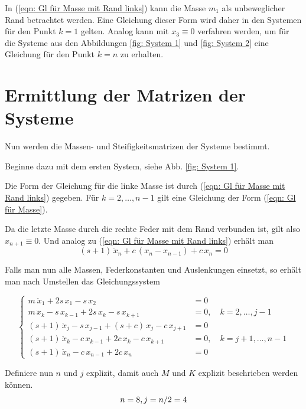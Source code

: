 \documentclass[a4paper,12pt]{report}
\newcommand{\1}{\mathds{1}}
\theoremstyle{plain} %
\theoremstyle{definition} %
\theoremstyle{remark}
\begin{document}
            In (\ref{eqn: Gl für Masse mit Rand links}) kann die Masse $m_1$ als unbeweglicher Rand betrachtet werden.
            Eine Gleichung dieser Form wird daher in den Systemen für den Punkt $k=1$ gelten.
            Analog kann mit $x_3\equiv 0$ verfahren werden, um für die Systeme aus den Abbildungen \ref{fig: System 1} und \ref{fig: System 2}
            eine Gleichung für den Punkt $k=n$ zu erhalten.

      \section{Ermittlung der Matrizen der Systeme}
            Nun werden die Massen- und Steifigkeitsmatrizen der Systeme bestimmt.
           
            Beginne dazu mit dem ersten System, siehe Abb. \ref{fig: System 1}.

            Die Form der Gleichung für die linke Masse ist durch (\ref{eqn: Gl für Masse mit Rand links}) gegeben.
            Für $k=2,\dots, n-1$ gilt eine Gleichung der Form (\ref{eqn: Gl für Masse}).
            
            Da die letzte Masse durch die rechte Feder mit dem Rand verbunden ist, gilt also $x_{n+1} \equiv 0$.
            Und analog zu (\ref{eqn: Gl für Masse mit Rand links}) erhält man
            $$(s+1)\,\ddot x_n + c\,(x_n-x_{n-1}) + c\,x_n = 0$$  

            Falls man nun alle Massen, Federkonstanten und Auslenkungen einsetzt, so erhält man nach Umstellen das Gleichungssystem

            $$\begin{cases}
                  m\ \ddot x_1 + 2s\,x_1 - s\,x_2 & = 0   \\
                  m\,\ddot x_k -s\,x_{k-1} + 2s\,x_k -s\,x_{k+1} & = 0,\quad k=2,\dots,j-1\\
                  (s+1)\,\ddot x_j -s\,x_{j-1} + (s+c)\,x_j -c\,x_{j+1} & = 0\\
                  (s+1)\,\ddot x_k -c\,x_{k-1} + 2c\,x_k -c\,x_{k+1} & = 0,\quad k=j+1,\dots,n-1\\
                  (s+1)\,\ddot x_n -c\,x_{n-1}+ 2c\,x_n & = 0
            \end{cases}$$


            Definiere nun $n$ und $j$ explizit, damit auch $M$ und $K$ explizit beschrieben werden können.
            \begin{equation}
                  \label{def: nUndJ explizit}
                  n=8,\\
                  j=n/2=4
            \end{equation}
\end{document}
